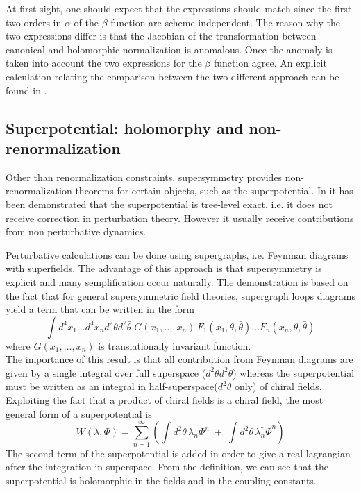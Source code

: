 At first sight, one should expect that the expressions should match since the first two orders in $\alpha$ of the $\beta$ function are scheme independent. 
The reason why the two expressions differ is that the Jacobian of the transformation between canonical and holomorphic normalization is anomalous. 
Once the anomaly is taken into account the two expressions for the $\beta$ function agree. 
An explicit calculation relating the comparison between the two different approach can be found in \cite{ArkaniHamed:1997mj}.










\subsection{Superpotential: holomorphy and non-renormalization}
Other than renormalization constraints, supersymmetry provides non-renormalization theorems for certain objects, such as the superpotential.
In \cite{Grisaru:1979wc} it has been demonstrated that the superpotential is tree-level exact, i.e. it does not receive correction in perturbation theory. 
However it usually receive contributions from non perturbative dynamics.

Perturbative calculations can be done using supergraphs, i.e. Feynman diagrams with superfields. 
The advantage of this approach is that supersymmetry is explicit and many semplification occur naturally. 
The demonstration is based on the fact that for general supersymmetric field theories, supergraph loops diagrams yield a term that can be written in the form
\begin{equation}
\int  d^4 x_1 \dots d^4 x_n d^2 \theta d^2 \bar{\theta} \; G (x_1 , \dots , x_n) \,F_1 ( x_1, \theta, \bar{\theta}) \dots  F_n ( x_n, \theta, \bar{\theta}) 
\end{equation} 
where $G (x_1 , \dots , x_n) $ is translationally invariant function.\\
The importance of this result is that all contribution from Feynman diagrams are given by a single integral over full superspace ($d^2 \theta d^2 \bar{\theta} $) whereas the superpotential must be written as an integral in half-superspace($d^2 \theta $ only) of chiral fields.
Exploiting the fact that a product of chiral fields is a chiral field, the most general form of a superpotential is 
\begin{equation}
 W (\lambda, \Phi) = \sum_{n=1}^{\infty} \left( \int d^2 \theta \, \lambda_n \Phi^n  \; +\;  \int d^2 \bar{\theta} \, \lambda_n^{\dagger} \bar{\Phi}^n \right)
 \end{equation} 
 The second term of the superpotential is added in order to give a real lagrangian after the integration in superspace.
From the definition, we can see that the superpotential is holomorphic in the fields and in the coupling constants.

